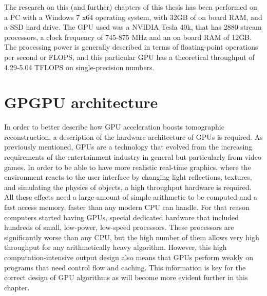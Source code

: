 The research on this (and further) chapters of this thesis has been performed on a PC with a Windows 7 x64 operating system, with 32GB of on board RAM, and a SSD hard drive. The GPU used was a NVIDIA Tesla 40k, that has 2880 stream processors, a clock frequency of 745-875 MHz and an on board RAM of 12GB. The processing power is generally described in terms of floating-point operations per second or FLOPS, and this particular GPU has a theoretical throughput of 4.29-5.04 TFLOPS on single-precision numbers.

\section{GPGPU architecture}

In order to better describe how GPU acceleration boosts tomographic reconstruction, a description of the hardware architecture of GPUs is required. As previously mentioned, GPUs are a technology that evolved from the increasing requirements of the entertainment industry in general but particularly from video games. In order to be able to have more realistic real-time graphics, where the environment reacts to the user interface by changing light reflections, textures, and simulating the physics of objects, a high throughput hardware is required. All these effects need a large amount of simple arithmetic to be computed and a fast access memory, faster than any modern CPU can handle. For that reason computers started having GPUs, special dedicated hardware that included hundreds of small, low-power, low-speed processors. These processors are significantly worse than any CPU, but the high number of them allows very high throughput for any arithmetically heavy algorithm. However, this high computation-intensive output design also means that GPUs perform weakly on programs that need control flow and caching. This information is key for the correct design of GPU algorithms as will become more evident further in this chapter.

